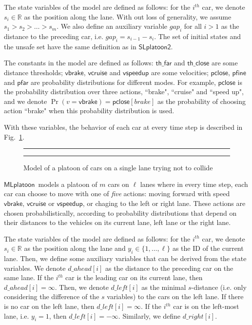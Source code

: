 \documentclass[11pt]{article}
\theoremstyle{definition}
\newcommand{\SlplatoonTwo}{{$\mathsf{SLplatoon2}$\xspace}}
\newcommand{\Mlplatoon}{{$\mathsf{MLplatoon}$\xspace}}
\newcommand{\two}[4]{
  \parbox{.95\columnwidth}{\vspace{1pt} \vfill
    \parbox[t]{#1\columnwidth}{#3}%
    \parbox[t]{#2\columnwidth}{#4}%
  }}
\begin{document}
The state variables of the model are defined as follows: for the $i^{th}$ car, we denote $s_i \in \mathbb{R}$ as the position along the lane. With out loss of generality, we assume $s_1> s_2 > \ldots > s_m$. We also define an auxiliary variable $\mathit{gap}_i$ for all $i>1$ as the distance to the preceding car, i.e. $\mathit{gap}_i = s_{i-1} - s_i$. The set of initial states and the unsafe set have the same definition as in \SlplatoonTwo.

The constants in the model are defined as follows: $\mathsf{th\_far}$ and $\mathsf{th\_close}$ are some distance thresholds; $\mathsf{vbrake}$, $\mathsf{vcruise}$ and $\mathsf{vspeedup}$ are some velocities; $\mathsf{pclose}$, $\mathsf{pfine}$ and $\mathsf{pfar}$ are probability distributions for different modes. For example, $\mathsf{pclose}$ is the probability distribution over three actions, ``brake", ``cruise" and ``speed up", and we denote $\Pr(v=\mathsf{vbrake}) = \mathsf{pclose}[brake]$ as the probability of choosing action ``brake" when this probability distribution is used.

With these variables, the behavior of each car at every time step is described in Fig.~\ref{fig:Slplatoon3}.
%
\begin{figure}
	\centering
	\hrule
	\two{.3}{.70}
	{}
	{}
	\hrule
	\caption{Model of a platoon of cars on a single lane trying not to collide}
	\label{fig:Slplatoon3}
\end{figure}

\Mlplatoon\ models a platoon of $m$ cars on $\ell$ lanes where in every time step, each car can choose to move with one of {\em five\/} actions: moving forward with speed $\mathsf{vbrake}$, $\mathsf{vcruise}$ or $\mathsf{vspeedup}$, or chaging to the left or right lane. These actions are chosen probabilistically, according to probability distributions that depend on their distances to the vehicles on its current lane, left lane or the right lane.

The state variables of the model are defined as follows: for the $i^{th}$ car, we denote $s_i \in \mathbb{R}$ as the position along the lane and $y_i \in \{1, \ldots, \ell\}$ as the ID of the current lane. Then, we define some auxiliary variables that can be derived from the state variables. We denote $\mathit{d\_ahead}[i]$ as the distance to the preceding car on the same lane. If the $i^{th}$ car is the leading car on its current lane, then $\mathit{d\_ahead}[i] = \infty$. Then, we denote $\mathit{d\_left}[i]$ as the minimal $s$-distance (i.e. only considering the difference of the $s$ variables) to the cars on the left lane. If there is no car on the left lane, then $\mathit{d\_left}[i] = \infty$. If the $i^{th}$ car is on the left-most lane, i.e. $y_i = 1$, then $\mathit{d\_left}[i] = -\infty$. Similarly, we define $\mathit{d\_right}[i]$.
\end{document}

